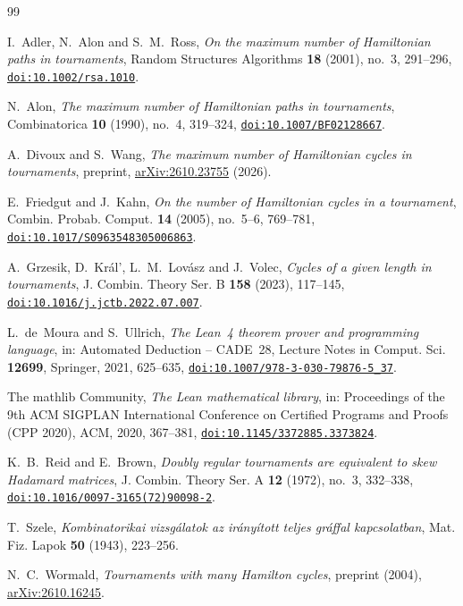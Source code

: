 \documentclass[11pt]{amsart}
\theoremstyle{remark}
\numberwithin{equation}{section}
\newcommand{\doi}[1]{\href{https://doi.org/#1}{\nolinkurl{doi:#1}}}
\begin{document}
\begin{thebibliography}{99}

I.~Adler, N.~Alon and S.~M.~Ross, \emph{On the maximum number of Hamiltonian paths in tournaments}, Random Structures Algorithms \textbf{18} (2001), no.~3, 291--296, \doi{10.1002/rsa.1010}.

N.~Alon, \emph{The maximum number of Hamiltonian paths in tournaments}, Combinatorica \textbf{10} (1990), no.~4, 319--324, \doi{10.1007/BF02128667}.

A.~Divoux and S.~Wang, \emph{The maximum number of Hamiltonian cycles in tournaments}, preprint, \href{https://arxiv.org/abs/2610.23755}{arXiv:2610.23755} (2026).

E.~Friedgut and J.~Kahn, \emph{On the number of Hamiltonian cycles in a tournament}, Combin. Probab. Comput. \textbf{14} (2005), no.~5--6, 769--781, \doi{10.1017/S0963548305006863}.

A.~Grzesik, D.~Kr\'al', L.~M.~Lov\'asz and J.~Volec, \emph{Cycles of a given length in tournaments}, J. Combin. Theory Ser. B \textbf{158} (2023), 117--145, \doi{10.1016/j.jctb.2022.07.007}.

L.~de~Moura and S.~Ullrich, \emph{The Lean~4 theorem prover and programming language}, in: Automated Deduction -- CADE~28, Lecture Notes in Comput. Sci. \textbf{12699}, Springer, 2021, 625--635, \doi{10.1007/978-3-030-79876-5_37}.

The mathlib Community, \emph{The Lean mathematical library}, in: Proceedings of the 9th ACM SIGPLAN International Conference on Certified Programs and Proofs (CPP 2020), ACM, 2020, 367--381, \doi{10.1145/3372885.3373824}.

K.~B.~Reid and E.~Brown, \emph{Doubly regular tournaments are equivalent to skew Hadamard matrices}, J. Combin. Theory Ser. A \textbf{12} (1972), no.~3, 332--338, \doi{10.1016/0097-3165(72)90098-2}.

T.~Szele, \emph{Kombinatorikai vizsg\'alatok az ir\'any\'itott teljes gr\'affal kapcsolatban}, Mat. Fiz. Lapok \textbf{50} (1943), 223--256.

N.~C.~Wormald, \emph{Tournaments with many Hamilton cycles}, preprint (2004), \href{https://arxiv.org/abs/2610.16245}{arXiv:2610.16245}.

\end{thebibliography}
\end{document}
